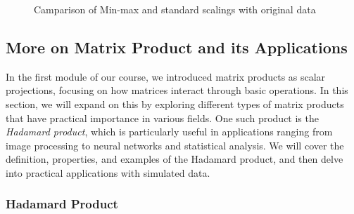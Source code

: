\documentclass[
  letterpaper,
  DIV=11,
  numbers=noendperiod]{scrreprt}
\theoremstyle{plain}
\theoremstyle{definition}
\theoremstyle{remark}
\begin{document}
\begin{figure}[H]


\caption{\label{fig-comp2}Camparison of Min-max and standard scalings
with original data}

\end{figure}%

\subsection*{More on Matrix Product and its
Applications}\label{more-on-matrix-product-and-its-applications}

In the first module of our course, we introduced matrix products as
scalar projections, focusing on how matrices interact through basic
operations. In this section, we will expand on this by exploring
different types of matrix products that have practical importance in
various fields. One such product is the \emph{Hadamard product}, which
is particularly useful in applications ranging from image processing to
neural networks and statistical analysis. We will cover the definition,
properties, and examples of the Hadamard product, and then delve into
practical applications with simulated data.

\subsubsection*{Hadamard Product}\label{hadamard-product}
\end{document}
